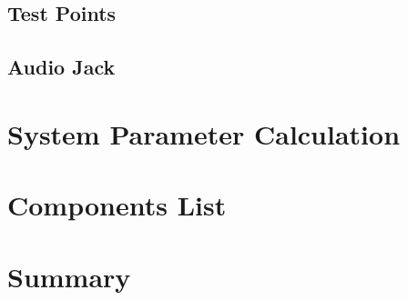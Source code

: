\documentclass[]{article}
\begin{document}
\subsection{Test Points}
\subsection{Audio Jack}
\section{System Parameter Calculation}
\section{Components List}
\section{Summary}
\end{document}
